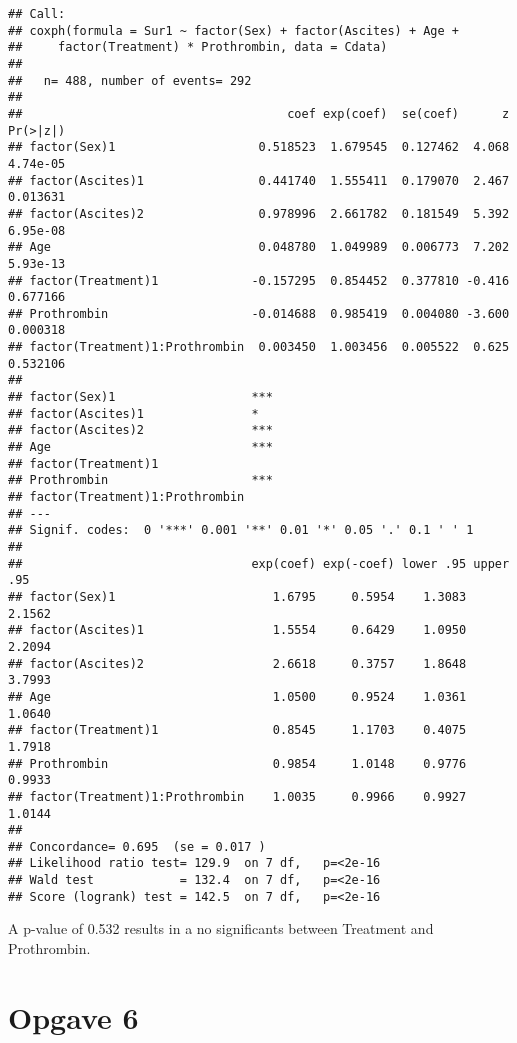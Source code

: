 \documentclass[
]{article}
\begin{document}
\begin{verbatim}
## Call:
## coxph(formula = Sur1 ~ factor(Sex) + factor(Ascites) + Age + 
##     factor(Treatment) * Prothrombin, data = Cdata)
## 
##   n= 488, number of events= 292 
## 
##                                     coef exp(coef)  se(coef)      z Pr(>|z|)
## factor(Sex)1                    0.518523  1.679545  0.127462  4.068 4.74e-05
## factor(Ascites)1                0.441740  1.555411  0.179070  2.467 0.013631
## factor(Ascites)2                0.978996  2.661782  0.181549  5.392 6.95e-08
## Age                             0.048780  1.049989  0.006773  7.202 5.93e-13
## factor(Treatment)1             -0.157295  0.854452  0.377810 -0.416 0.677166
## Prothrombin                    -0.014688  0.985419  0.004080 -3.600 0.000318
## factor(Treatment)1:Prothrombin  0.003450  1.003456  0.005522  0.625 0.532106
##                                   
## factor(Sex)1                   ***
## factor(Ascites)1               *  
## factor(Ascites)2               ***
## Age                            ***
## factor(Treatment)1                
## Prothrombin                    ***
## factor(Treatment)1:Prothrombin    
## ---
## Signif. codes:  0 '***' 0.001 '**' 0.01 '*' 0.05 '.' 0.1 ' ' 1
## 
##                                exp(coef) exp(-coef) lower .95 upper .95
## factor(Sex)1                      1.6795     0.5954    1.3083    2.1562
## factor(Ascites)1                  1.5554     0.6429    1.0950    2.2094
## factor(Ascites)2                  2.6618     0.3757    1.8648    3.7993
## Age                               1.0500     0.9524    1.0361    1.0640
## factor(Treatment)1                0.8545     1.1703    0.4075    1.7918
## Prothrombin                       0.9854     1.0148    0.9776    0.9933
## factor(Treatment)1:Prothrombin    1.0035     0.9966    0.9927    1.0144
## 
## Concordance= 0.695  (se = 0.017 )
## Likelihood ratio test= 129.9  on 7 df,   p=<2e-16
## Wald test            = 132.4  on 7 df,   p=<2e-16
## Score (logrank) test = 142.5  on 7 df,   p=<2e-16
\end{verbatim}

A p-value of 0.532 results in a no significants between Treatment and
Prothrombin.

\hypertarget{opgave-6}{%
\section{Opgave 6}\label{opgave-6}}
\end{document}
